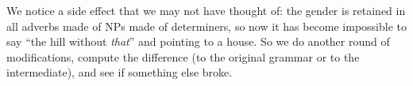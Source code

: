 \documentclass[runningheads]{llncs}
\begin{document}
\noindent We notice a side effect that we may not have thought of: the
gender is retained in all adverbs made of NPs made of determiners, so
now it has become impossible to say ``the hill without \emph{that}'' and
pointing to a house. So we do another round of modifications, compute
the difference (to the original grammar or to the intermediate), and
see if something else broke.






%
%
%


\end{document}

